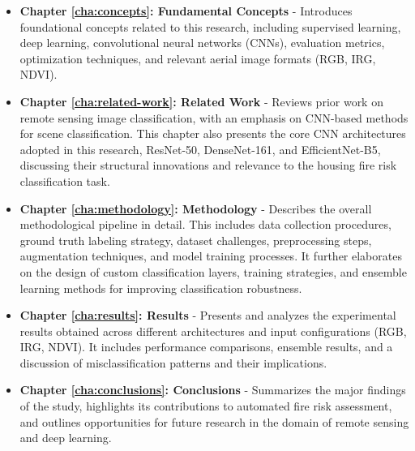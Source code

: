 \begin{itemize}
    \item \textbf{Chapter \ref{cha:concepts}: Fundamental Concepts} - Introduces foundational concepts related to this research, including supervised learning, deep learning, convolutional neural networks (CNNs), evaluation metrics, optimization techniques, and relevant aerial image formats (RGB, IRG, NDVI).
    
    \item \textbf{Chapter \ref{cha:related-work}: Related Work} - Reviews prior work on remote sensing image classification, with an emphasis on CNN-based methods for scene classification. This chapter also presents the core CNN architectures adopted in this research, ResNet-50, DenseNet-161, and EfficientNet-B5, discussing their structural innovations and relevance to the housing fire risk classification task.
    
    \item \textbf{Chapter \ref{cha:methodology}: Methodology} - Describes the overall methodological pipeline in detail. This includes data collection procedures, ground truth labeling strategy, dataset challenges, preprocessing steps, augmentation techniques, and model training processes. It further elaborates on the design of custom classification layers, training strategies, and ensemble learning methods for improving classification robustness.
    
    \item \textbf{Chapter \ref{cha:results}: Results} - Presents and analyzes the experimental results obtained across different architectures and input configurations (RGB, IRG, NDVI). It includes performance comparisons, ensemble results, and a discussion of misclassification patterns and their implications.
    
    \item \textbf{Chapter \ref{cha:conclusions}: Conclusions} - Summarizes the major findings of the study, highlights its contributions to automated fire risk assessment, and outlines opportunities for future research in the domain of remote sensing and deep learning.
\end{itemize}
